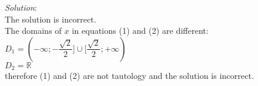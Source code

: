 \documentclass[10pt]{article}
\begin{document}
\bigbreak
\textit{Solution}: \\
    The solution is incorrect. \\
    The domains of $x$ in equations (1) and (2) are different: \\
    $D_{1} = (-\infty; -\dfrac{\sqrt{2}}{2}] \cup [\dfrac{\sqrt{2}}{2}; +\infty)$ \\
    $D_{2} = \mathbb{R}$ \\
    therefore (1) and (2) are not tautology and the solution is incorrect. \\
\end{document}
